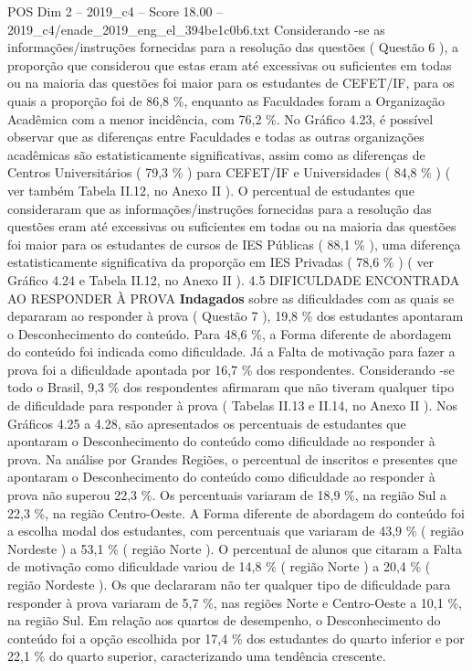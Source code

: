 \begin{textsample}{POS Dim 2 – 2019\_c4 – Score 18.00 – 2019\_c4/enade\_2019\_eng\_el\_394be1c0b6.txt}
Considerando -se as informações/instruções fornecidas para a resolução das questões ( Questão 6 ), a proporção que considerou que estas eram até excessivas ou suficientes em todas ou na maioria das questões foi maior para os estudantes de CEFET/IF, para os quais a proporção foi de 86,8 \%, enquanto as Faculdades foram a Organização Acadêmica com a menor incidência, com 76,2 \%.
No Gráfico 4.23, é possível observar que as diferenças entre Faculdades e todas as outras organizações acadêmicas são estatisticamente significativas, assim como as diferenças de Centros Universitários ( 79,3 \% ) para CEFET/IF e Universidades ( 84,8 \% ) ( ver também Tabela II.12, no Anexo II ).
O percentual de estudantes que consideraram que as informações/instruções fornecidas para a resolução das questões eram até excessivas ou suficientes em todas ou na maioria das questões foi maior para os estudantes de cursos de IES Públicas ( 88,1 \% ), uma diferença estatisticamente significativa da proporção em IES Privadas ( 78,6 \% ) ( ver Gráfico 4.24 e Tabela II.12, no Anexo II ). 4.5 DIFICULDADE ENCONTRADA AO RESPONDER À PROVA \textbf{Indagados} sobre as dificuldades com as quais se depararam ao responder à prova ( Questão 7 ), 19,8 \% dos estudantes apontaram o Desconhecimento do conteúdo.
Para 48,6 \%, a Forma diferente de abordagem do conteúdo foi indicada como dificuldade.
Já a Falta de motivação para fazer a prova foi a dificuldade apontada por 16,7 \% dos respondentes.
Considerando -se todo o Brasil, 9,3 \% dos respondentes afirmaram que não tiveram qualquer tipo de dificuldade para responder à prova ( Tabelas II.13 e II.14, no Anexo II ).
Nos Gráficos 4.25 a 4.28, são apresentados os percentuais de estudantes que apontaram o Desconhecimento do conteúdo como dificuldade ao responder à prova.
Na análise por Grandes Regiões, o percentual de inscritos e presentes que apontaram o Desconhecimento do conteúdo como dificuldade ao responder à prova não superou 22,3 \%.
Os percentuais variaram de 18,9 \%, na região Sul a 22,3 \%, na região Centro-Oeste.
A Forma diferente de abordagem do conteúdo foi a escolha modal dos estudantes, com percentuais que variaram de 43,9 \% ( região Nordeste ) a 53,1 \% ( região Norte ).
O percentual de alunos que citaram a Falta de motivação como dificuldade variou de 14,8 \% ( região Norte ) a 20,4 \% ( região Nordeste ).
Os que declararam não ter qualquer tipo de dificuldade para responder à prova variaram de 5,7 \%, nas regiões Norte e Centro-Oeste a 10,1 \%, na região Sul.
Em relação aos quartos de desempenho, o Desconhecimento do conteúdo foi a opção escolhida por 17,4 \% dos estudantes do quarto inferior e por 22,1 \% do quarto superior, caracterizando uma tendência crescente.

\end{textsample}
